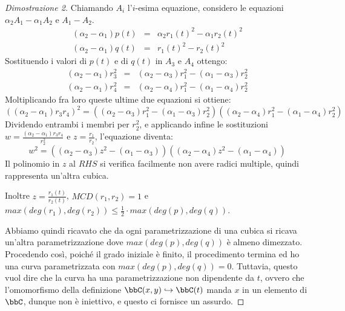 \begin{proof}[Dimostrazione 2]
Chiamando $A_i$ l'$i$-esima equazione, considero le equazioni $\alpha_2A_1-\alpha_1A_2$ e $A_1-A_2$.
\begin{eqnarray*}
  (\alpha_2-\alpha_1)p(t) &=& \alpha_2r_1(t)^2-\alpha_1r_2(t)^2 \\
  (\alpha_2-\alpha_1)q(t) &=& r_1(t)^2-r_2(t)^2
\end{eqnarray*}
Sostituendo i valori di $p(t)$ e di $q(t)$ in $A_3$ e $A_4$ ottengo:
\begin{eqnarray*}
  (\alpha_2-\alpha_1)r_3^2 &=& (\alpha_2-\alpha_3)r_1^2-(\alpha_1-\alpha_3)r_2^2 \\
  (\alpha_2-\alpha_1)r_4^2 &=& (\alpha_2-\alpha_4)r_1^2-(\alpha_1-\alpha_4)r_2^2
\end{eqnarray*}
Moltiplicando fra loro queste ultime due equazioni si ottiene:
\begin{equation*}
  ((\alpha_2-\alpha_1)r_3r_4)^2 = ((\alpha_2-\alpha_3)r_1^2-(\alpha_1-\alpha_3)r_2^2)((\alpha_2-\alpha_4)r_1^2-(\alpha_1-\alpha_4)r_2^2)
\end{equation*}
Dividendo entrambi i membri per $r_2^2$, e applicando infine le sostituzioni $w=\frac{(\alpha_2-\alpha_1)r_3r_4}{r_2^2}$ e $z=\frac{r_1}{r_2}$, l'equazione diventa:
$$w^2=((\alpha_2-\alpha_3)z^2-(\alpha_1-\alpha_3))((\alpha_2-\alpha_4)z^2-(\alpha_1-\alpha_4))$$
Il polinomio in $z$ al $RHS$ si verifica facilmente non avere radici multiple, quindi rappresenta un'altra cubica.

Inoltre $z=\frac{r_1(t)}{r_2(t)}$, $MCD(r_1,r_2)=1$ e $max(deg(r_1), deg(r_2))\leq\frac{1}{2}\cdot max(deg(p),deg(q))$.

Abbiamo quindi ricavato che da ogni parametrizzazione di una cubica si ricava un'altra parametrizzazione dove $max(deg(p),deg(q))$ è almeno dimezzato.
Procedendo così, poiché il grado iniziale è finito, il procedimento termina ed ho una curva parametrizzata con $max(deg(p),deg(q))=0$. 
Tuttavia, questo vuol dire che la curva ha una parametrizzazione non dipendente da $t$, ovvero che l'omomorfismo della definizione $\bbC(x,y)\hookrightarrow\bbC(t)$ manda $x$ in un elemento di $\bbC$, dunque non è iniettivo, e questo ci fornisce un assurdo.
\end{proof}
